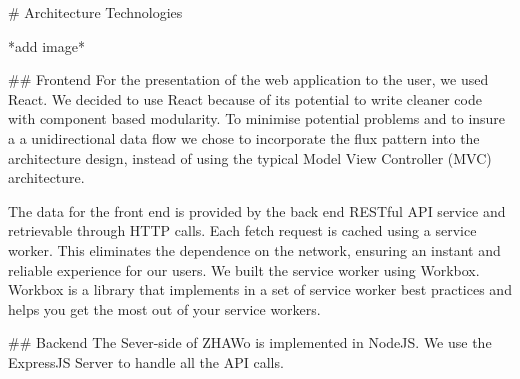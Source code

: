 \begin{markdown}


# Architecture Technologies

*add image*

## Frontend
For the presentation of the web application to the user, we used React\cite{React}. We decided to use React because of its potential to write cleaner code with component based modularity. To minimise potential problems and to insure a a unidirectional data flow we chose to incorporate  the flux pattern into the architecture design, instead of using the typical Model View Controller (MVC) architecture.

The data for the front end is provided by the back end RESTful API service and retrievable through HTTP calls. Each fetch request is cached using a service worker. This eliminates the dependence on the network, ensuring an instant and reliable experience for our users. We built the service worker using Workbox\cite{Workbox}. Workbox is a library that implements in a set of service worker best practices and helps you get the most out of your service workers.

## Backend
The Sever-side of ZHAWo is implemented in NodeJS\cite{Node}. We use the ExpressJS Server to handle all the API calls.




\end{markdown}
